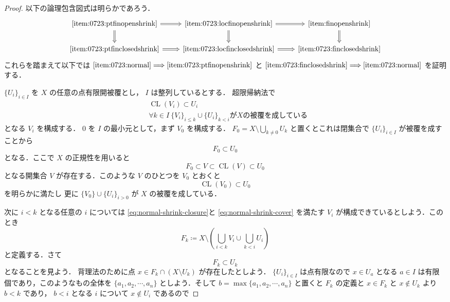 \documentclass[leqno, 12pt]{ltjsarticle}
\newcommand{\To}{\Longrightarrow}
\DeclareMathOperator{\cl}{CL}
\begin{document}
\begin{proof}
以下の論理包含図式は明らかであろう．
\[
\begin{tikzcd}
  & \ref{item:0723:ptfinopenshrink} \arrow[r, Rightarrow] \arrow[d, Rightarrow]
  & \ref{item:0723:locfinopenshrink} \arrow[r, Rightarrow] \arrow[d, Rightarrow]
  & \ref{item:finopenshrink} \arrow[d, Rightarrow] & \\
  & \ref{item:0723:ptfinclosedshrink} \arrow[r, Rightarrow]
  & \ref{item:0723:locfinclosedshrink} \arrow[r, Rightarrow]
  & \ref{item:0723:finclosedshrink} &
\end{tikzcd}
\]
これらを踏まえて以下では
$\ref{item:0723:normal}\To\ref{item:0723:ptfinopenshrink}$
と
$\ref{item:0723:finclosedshrink}\To\ref{item:0723:normal}$
を証明する．
\par
[$\ref{item:0723:normal}\To\ref{item:0723:ptfinopenshrink}$
の証明]\par
$\{U_{i}\}_{i\in I}$
を
$X$
の任意の点有限開被覆とし，
$I$
は整列しているとする．
超限帰納法で
\begin{align}
&\cl(V_{i})\subset U_{i}
  \tag{a}\label{eq:normal-shrink-closure}\\
&\forall k\in I\ \{V_{i}\}_{i\le k}\cup\{U_{i}\}_{k<i}
  \text{が$X$の被覆を成している}
  \tag{b}\label{eq:normal-shrink-cover}
\end{align}
となる
$V_{i}$
を構成する．
$0$
を
$I$
の最小元として，まず
$V_{0}$
を構成する．
$F_{0}=X\setminus \bigcup_{k\neq0}U_{k}$
と置くとこれは閉集合で
$\{U_{i}\}_{i\in I}$
が被覆を成すことから
\[
F_{0}\subset U_{0}
\]
となる．ここで
$X$
の正規性を用いると
\[
F_{0}\subset V\subset \cl(V)\subset U_{0}
\]
となる開集合
$V$
が存在する．このような
$V$
のひとつを
$V_{0}$
とおくと
\[
\cl(V_{0})\subset U_{0}
\]
を明らかに満たし
更に
$\{V_{0}\}\cup\{U_{i}\}_{i>0}$
が
$X$
の被覆を成している．\par
次に
$i<k$
となる任意の
$i$
については
\eqref{eq:normal-shrink-closure}と
\eqref{eq:normal-shrink-cover}
を満たす
$V_{i}$
が構成できているとしよう．このとき
\[
F_{k}\coloneqq X\setminus \left(\bigcup_{i<k}V_{i}\cup \bigcup_{k<i}U_{i}\right)
\]
と定義する．さて
\[
F_{k}\subset U_{k}
\]
となることを見よう．
背理法のために点
$x\in F_{k}\cap (X\setminus U_{k})$
が存在したとしよう．
$\{U_{i}\}_{i\in I}$
は点有限なので
$x\in U_{a}$
となる
$a\in I$
は有限個であり，このようなもの全体を
$\{a_{1},a_{2},\cdots,a_{n}\}$
としよう．そして
$b=\max\{a_{1},a_{2},\cdots ,a_{n}\}$
と置くと
$F_{k}$
の定義と
$x\in F_{k}$
と
$x\notin U_{k}$
より
$b<k$
であり，
$b<i$
となる
$i$
について
$x\notin U_{i}$
であるので

\end{proof}
\end{document}
